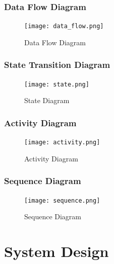 \documentclass[12pt,a4paper,final]{report}
\begin{document}
\subsection{Data Flow Diagram}
\begin{figure}[h]
\begin{center}
\texttt{[image: data\_flow.png]}
\caption{Data Flow Diagram}
\end{center}
\end{figure}
\newpage	

\subsection{State Transition Diagram}
\begin{figure}[h]
\begin{center}
\texttt{[image: state.png]}
\caption{State Diagram}
\end{center}
\end{figure}

\subsection{Activity Diagram}
\begin{figure}[h]
\begin{center}
\texttt{[image: activity.png]}
\caption{Activity Diagram}
\end{center}
\end{figure}
\newpage

\subsection{Sequence Diagram}
\begin{figure}[h]
\begin{center}
\texttt{[image: sequence.png]}
\caption{Sequence Diagram}
\end{center}
\end{figure}
\newpage

\chapter{System Design}
\thispagestyle{empty}
\newpage
\end{document}

